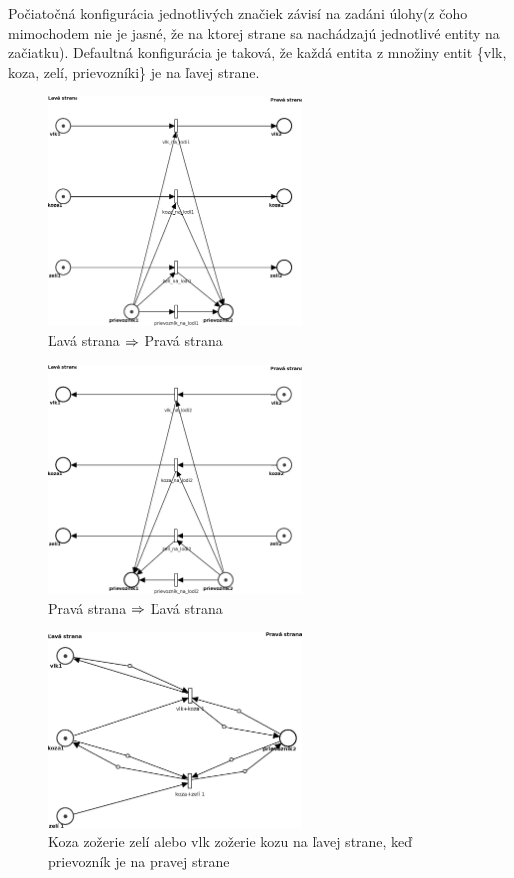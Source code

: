 \documentclass[11pt,a4paper]{article}
\begin{document}
Počiatočná konfigurácia jednotlivých značiek závisí na zadáni úlohy(z čoho mimochodem nie je jasné, že na ktorej strane sa nachádzajú jednotlivé entity na začiatku). Defaultná konfigurácia je taková, že každá entita z množiny entit \{vlk, koza, zelí, prievozníki\} je na ľavej strane.

\begin{figure}[H]
    \centering
	\includegraphics[width=0.6\textwidth]{pn1NEW.eps}
    \caption{Ľavá strana $\protect\Rightarrow$ Pravá strana}
    \label{fig:pn1}
\end{figure}

\begin{figure}[H]
    \centering
	\includegraphics[width=0.6\textwidth]{pn2NEW.eps}
    \caption{Pravá strana $\protect\Rightarrow$ Ľavá strana}
    \label{fig:pn2}
\end{figure}

\begin{figure}[H]
    \centering
	\includegraphics[width=0.6\textwidth]{pn3NEW.eps}
    \caption{Koza zožerie zelí alebo vlk zožerie kozu na ľavej strane, keď prievozník je na pravej strane}
    \label{fig:pn3}
\end{figure}
\end{document}
